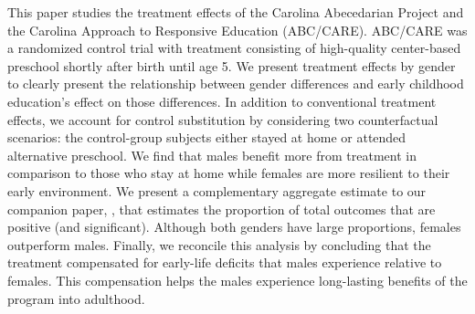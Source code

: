 \noindent This paper studies the treatment effects of the Carolina Abecedarian Project and the Carolina Approach to Responsive Education (ABC/CARE). ABC/CARE was a randomized control trial with treatment consisting of high-quality center-based preschool shortly after birth until age 5. We present treatment effects by gender to clearly present the relationship between gender differences and early childhood education's effect on those differences. In addition to conventional treatment effects, we account for control substitution by considering two counterfactual scenarios: the control-group subjects either stayed at home or attended alternative preschool. We find that males benefit more from treatment in comparison to those who stay at home while females are more resilient to their early environment. We present a complementary aggregate estimate to our companion paper, \citet{Garcia_Heckman_Leaf_etal_2017_Comp_CBA_Unpublished}, that estimates the proportion of total outcomes that are positive (and significant). Although both genders have large proportions, females outperform males. Finally, we reconcile this analysis by concluding that the treatment compensated for early-life deficits that males experience relative to females. This compensation helps the males experience long-lasting benefits of the program into adulthood.